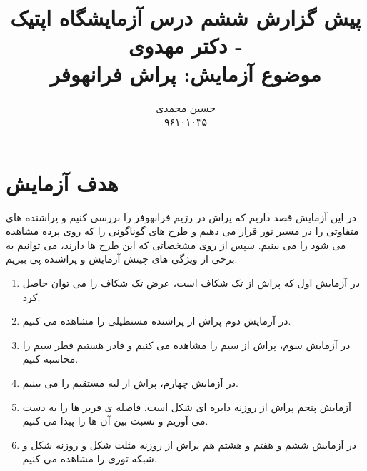 \documentclass{article}
\title{	
	پیش گزارش ششم درس آزمایشگاه اپتیک - دکتر مهدوی
	\\
	\small
	موضوع آزمايش: پراش فرانهوفر
}
\author{
حسین محمدی 
\\
۹۶۱۰۱۰۳۵
}
\begin{document}
\maketitle
\section{هدف آزمایش}
در این آزمایش قصد داریم که پراش در رژیم فرانهوفر را بررسی کنیم و پراشنده های متفاوتی را در مسیر نور قرار می دهیم و طرح های گوناگونی را که روی پرده مشاهده می شود را می بینیم. سپس از روی مشخصاتی که این طرح ها دارند، می توانیم به برخی از ویژگی های چینش آزمایش و پراشنده پی ببریم.
\begin{enumerate}
	\item
	در آزمایش اول که پراش از تک شکاف است، عرض تک شکاف را می توان حاصل کرد.
	\item
	در آزمایش دوم پراش از پراشنده مستطیلی را مشاهده می کنیم.
	\item
	در آزمایش سوم، پراش از سیم را مشاهده می کنیم و قادر هستیم قطر سیم را محاسبه کنیم.
	\item
	در آزمایش چهارم، پراش از لبه مستقیم را می بینیم.
	\item
	آزمایش پنجم پراش از روزنه دایره ای شکل است. فاصله ی فریز ها را به دست می آوریم و نسبت بین آن ها را پیدا می کنیم.
	\item
	در آزمایش ششم و هفتم و هشتم هم پراش از روزنه مثلث شکل و روزنه 
	شکل و شبکه توری را مشاهده می کنیم.

\end{enumerate}
\end{document}
